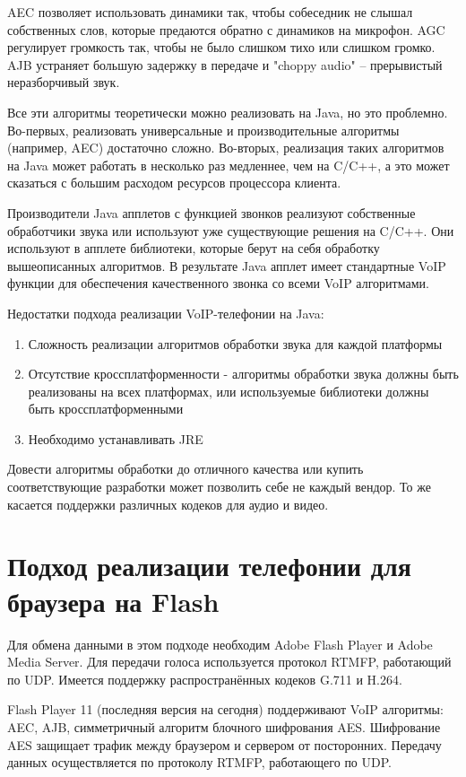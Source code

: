 AEC позволяет использовать динамики так, чтобы собеседник не слышал собственных слов, которые предаются обратно с динамиков на микрофон. AGC регулирует громкость так, чтобы не было слишком тихо или слишком громко. AJB устраняет большую задержку в передаче и "choppy audio" – прерывистый неразборчивый звук.

Все эти алгоритмы теоретически можно реализовать на Java, но это проблемно. Во-первых, реализовать универсальные и производительные алгоритмы (например, AEC) достаточно сложно. Во-вторых, реализация таких алгоритмов на Java может работать в несколько раз медленнее, чем на C/C++, а это может сказаться с большим расходом ресурсов процессора клиента.

Производители Java апплетов с функцией звонков реализуют собственные обработчики звука или используют уже существующие решения на C/C++. Они используют в апплете библиотеки, которые берут на себя обработку вышеописанных алгоритмов. В результате Java апплет имеет стандартные VoIP функции для обеспечения качественного звонка со всеми VoIP алгоритмами.

Недостатки подхода реализации VoIP-телефонии на Java:
\begin{enumerate}
\item Сложность реализации алгоритмов обработки звука для каждой платформы
\item Отсутствие кроссплатформенности - алгоритмы обработки звука должны быть реализованы на всех платформах, или используемые библиотеки должны быть кроссплатформенными
\item Необходимо устанавливать JRE
\end{enumerate}

Довести алгоритмы обработки до отличного качества или купить соответствующие разработки может позволить себе не каждый вендор. То же касается поддержки различных кодеков для аудио и видео.

\section{Подход реализации телефонии для браузера на Flash}

Для обмена данными в этом подходе необходим Adobe Flash Player и Adobe Media Server. Для передачи голоса используется протокол RTMFP, работающий по UDP. Имеется поддержку распространённых кодеков G.711 и H.264.

Flash Player 11 (последняя версия на сегодня) поддерживают VoIP алгоритмы: AEC, AJB, симметричный алгоритм блочного шифрования AES. Шифрование AES защищает трафик между браузером и сервером от посторонних. Передачу данных осуществляется по протоколу RTMFP, работающего по UDP.\cite{adobe}

